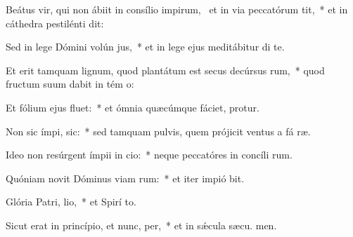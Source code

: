 \item Beátus vir, qui non ábiit in consílio impirum,~\pscross{} et in via peccatórum  tit,~* et in cáthedra pestilénti  dit:
\item Sed in lege Dómini volún jus,~* et in lege ejus meditábitur di  te.
\item Et erit tamquam lignum, quod plantátum est secus decúrsus rum,~* quod fructum suum dabit in tém o:
\item Et fólium ejus  fluet:~* et ómnia quæcúmque fáciet, protur.
\item Non sic ímpi,  sic:~* sed tamquam pulvis, quem prójicit ventus a fá ræ.
\item Ideo non resúrgent ímpii in cio:~* neque peccatóres in concíli rum.
\item Quóniam novit Dóminus viam rum:~* et iter impió bit.
\item Glória Patri,  lio,~* et Spirí to.
\item Sicut erat in princípio, et nunc,  per,~* et in sǽcula sæcu. men.
